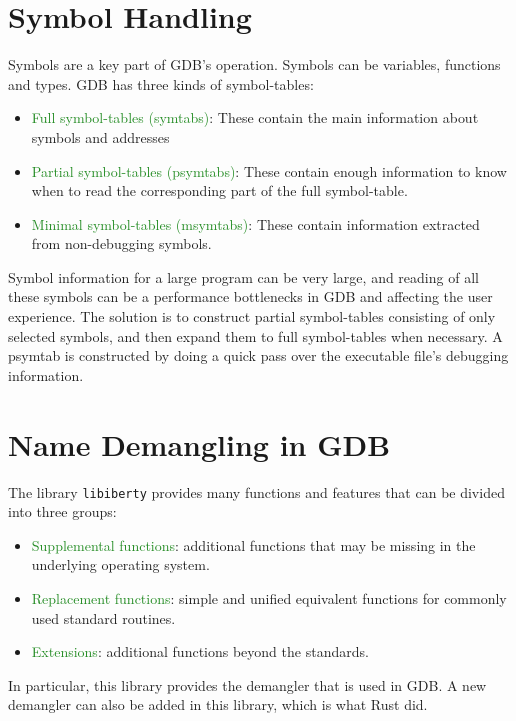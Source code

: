 \section{Symbol Handling}
Symbols are a key part of GDB's operation. Symbols can be variables, functions and
types. GDB has three kinds of symbol-tables:
\begin{itemize}
    \item \textcolor{ForestGreen}{Full symbol-tables (symtabs)}: These contain the main information
        about symbols and addresses
    \item \textcolor{ForestGreen} {Partial symbol-tables (psymtabs)}: These contain enough information to
        know when to read the corresponding part of the full symbol-table.
    \item \textcolor{ForestGreen}{Minimal symbol-tables (msymtabs)}: These
        contain information extracted from non-debugging symbols.
\end{itemize}

Symbol information for a large program can be very large, and reading of all
these symbols can be a performance bottlenecks in GDB and affecting the user
experience. The solution is to construct partial symbol-tables consisting of
only selected symbols, and then expand them to full symbol-tables when
necessary.
A psymtab is constructed by doing a quick pass over the executable file's
debugging information.

\section{Name Demangling in GDB}
The library \verb|libiberty| provides many functions and features that can be
divided into three groups:
\begin{itemize}
    \item \textcolor{ForestGreen}{Supplemental functions}: additional functions
        that may be missing in
        the underlying operating system.
    \item \textcolor{ForestGreen}{Replacement functions}: simple and unified equivalent functions for
        commonly used standard routines.
    \item \textcolor{ForestGreen}{Extensions}: additional functions beyond the standards.
\end{itemize}

In particular, this library provides the \CCS demangler that is used in GDB. A new
demangler can also be added in this library, which is what Rust did.
